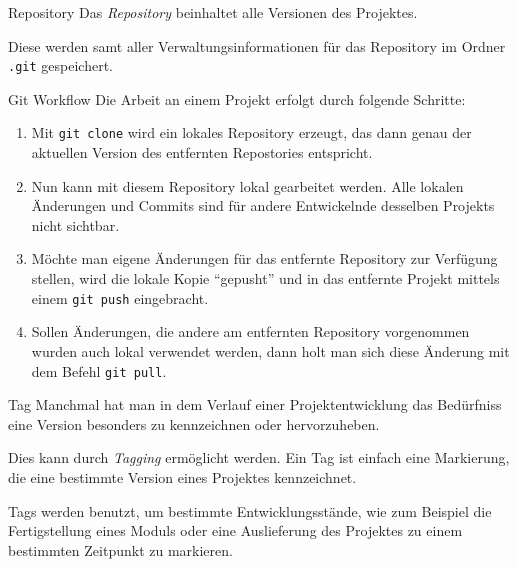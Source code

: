 \begin{defi}{Repository}
    Das \emph{Repository} beinhaltet alle Versionen des Projektes.

    Diese werden samt aller Verwaltungsinformationen für das Repository im Ordner \texttt{.git} gespeichert.
\end{defi}

\begin{bonus}{Git Workflow}
    Die Arbeit an einem Projekt erfolgt durch folgende Schritte:
    \begin{enumerate}
        \item Mit \texttt{git clone} wird ein lokales Repository erzeugt, das dann genau der aktuellen Version des entfernten Repostories entspricht.
        \item Nun kann mit diesem Repository lokal gearbeitet werden.
              Alle lokalen Änderungen und Commits sind für andere Entwickelnde desselben Projekts nicht sichtbar.
        \item Möchte man eigene Änderungen für das entfernte Repository zur Verfügung stellen, wird die lokale
              Kopie \enquote{gepusht} und in das entfernte Projekt mittels einem \texttt{git push} eingebracht.
        \item Sollen Änderungen, die andere am entfernten Repository vorgenommen wurden auch lokal verwendet werden, dann holt man sich diese Änderung mit dem Befehl \texttt{git pull}.
    \end{enumerate}
\end{bonus}

\begin{defi}{Tag}
    Manchmal hat man in dem Verlauf einer Projektentwicklung das Bedürfniss eine Version besonders zu kennzeichnen oder hervorzuheben.

    Dies kann durch \emph{Tagging} ermöglicht werden.
    Ein Tag ist einfach eine Markierung, die eine bestimmte Version eines Projektes kennzeichnet.

    Tags werden benutzt, um bestimmte Entwicklungsstände, wie zum Beispiel die Fertigstellung eines Moduls oder eine Auslieferung des Projektes zu einem bestimmten Zeitpunkt zu markieren.
\end{defi}

